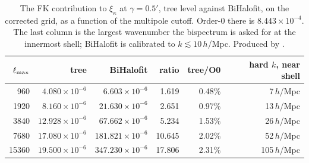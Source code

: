 \begin{table}[h]
\centering
\begin{tabular}{rrrrrr}
\toprule
$\ell_{\max}$ & tree & BiHalofit & ratio & tree/O0 & hard $k$, near shell \\
\midrule
960 & $4.080\times10^{-6}$ & $6.603\times10^{-6}$ & 1.619 & 0.48\% & 7\,$h$/Mpc \\
1920 & $8.160\times10^{-6}$ & $21.630\times10^{-6}$ & 2.651 & 0.97\% & 13\,$h$/Mpc \\
3840 & $12.928\times10^{-6}$ & $67.662\times10^{-6}$ & 5.234 & 1.53\% & 26\,$h$/Mpc \\
7680 & $17.080\times10^{-6}$ & $181.821\times10^{-6}$ & 10.645 & 2.02\% & 52\,$h$/Mpc \\
15360 & $19.500\times10^{-6}$ & $347.230\times10^{-6}$ & 17.806 & 2.31\% & 105\,$h$/Mpc \\
\bottomrule
\end{tabular}
\caption{The FK contribution to $\xi_\kappa$ at $\gamma=0.5'$, tree level against BiHalofit, on the corrected grid, as a function of the multipole cutoff. Order-0 there is $8.443\times10^{-4}$. The last column is the largest wavenumber the bispectrum is asked for at the innermost shell; BiHalofit is calibrated to $k\lesssim10\,h$/Mpc. Produced by .}
\label{tab:nonlinear}
\end{table}
